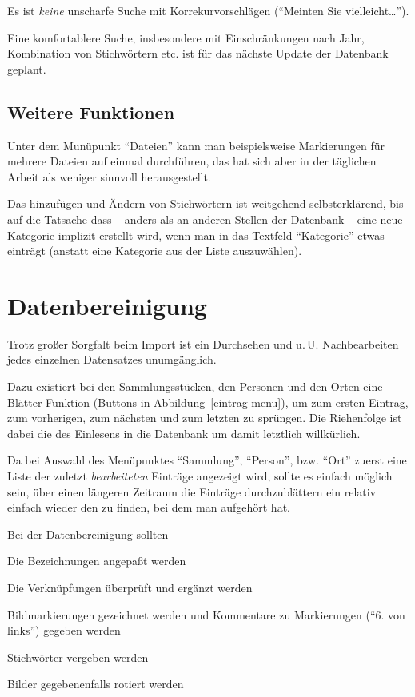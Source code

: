 \documentclass[12pt]{scrreprt}
\begin{document}
Es ist \textit{keine} unscharfe Suche mit Korrekurvorschlägen
(``Meinten Sie vielleicht\ldots'').

Eine komfortablere Suche, insbesondere mit Einschränkungen nach Jahr,
Kombination von Stichwörtern etc. ist für das nächste Update der Datenbank geplant.

\section{Weitere Funktionen}

Unter dem Munüpunkt ``Dateien'' kann man beispielsweise Markierungen für mehrere Dateien auf einmal
durchführen, das hat sich aber in der täglichen Arbeit als weniger sinnvoll herausgestellt.

Das hinzufügen und Ändern von Stichwörtern ist weitgehend selbsterklärend, bis auf die
Tatsache dass -- anders als an anderen Stellen der Datenbank -- eine neue Kategorie
implizit erstellt wird, wenn man in das Textfeld ``Kategorie'' etwas einträgt (anstatt eine
Kategorie aus der Liste auszuwählen).

\chapter{Datenbereinigung\label{curation}}

Trotz großer Sorgfalt beim Import ist ein Durchsehen und u.\,U. Nachbearbeiten
jedes einzelnen Datensatzes unumgänglich. 

Dazu existiert bei den Sammlungsstücken, den Personen und den Orten eine Blätter-Funktion
(Buttons  in Abbildung~\ref{eintrag-menu}), um zum ersten Eintrag, zum vorherigen,
zum nächsten und zum letzten zu sprüngen. Die Riehenfolge ist dabei die des Einlesens
in die Datenbank um damit letztlich willkürlich.

Da bei Auswahl des Menüpunktes ``Sammlung'', ``Person'', bzw. ``Ort'' zuerst eine Liste der
zuletzt \textit{bearbeiteten} Einträge angezeigt wird, sollte es einfach möglich sein,
über einen längeren Zeitraum die Einträge durchzublättern ein relativ einfach wieder den
zu finden, bei dem man aufgehört hat.

Bei der Datenbereinigung sollten
\begin{citemize}
\item Die Bezeichnungen angepaßt werden
\item Die Verknüpfungen überprüft und ergänzt werden
\item Bildmarkierungen gezeichnet werden und Kommentare zu Markierungen (``6. von links'')
  gegeben werden
\item Stichwörter vergeben werden
\item Bilder gegebenenfalls rotiert werden
\end{citemize}
\end{document}
